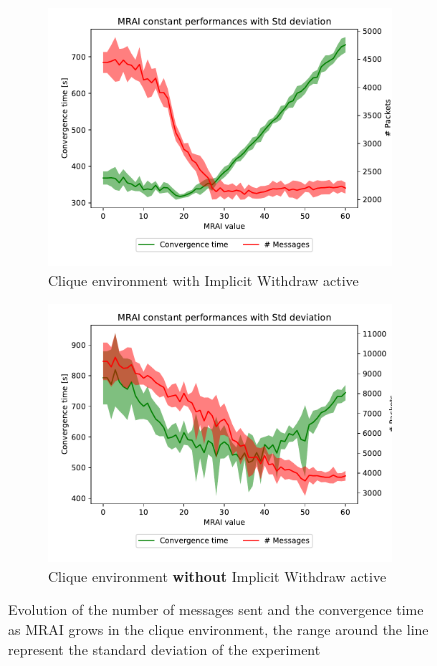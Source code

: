\documentclass[10pt,conference,letterpaper]{IEEEtran}
\newcommand{\figwidth}{0.78}
\newcommand{\figvspace}{-1.5em}
\begin{document}
\begin{figure}[tb]
	\centering

	\begin{subfigure}{\columnwidth}
		\centering
		\includegraphics[width=\figwidth\columnwidth]{images/clique/mrai_evolution_std_alpha}
		\caption{Clique environment with Implicit Withdraw active}
		\label{fig:clique_IW_mrai_evolution_std}
		\qquad
	\end{subfigure}

	\begin{subfigure}{\columnwidth}
		\centering
		\includegraphics[width=\figwidth\columnwidth]{images/clique-noImplicitWithdraw/mrai_evolution_std_alpha}
		\caption{Clique environment \textbf{without} Implicit Withdraw active}
		\label{fig:clique_noIW_mrai_evolution_std}
		\qquad
	\end{subfigure}

	\caption{Evolution of the number of messages sent and the convergence time as \ac{MRAI} grows
		in the clique environment, the range around the line represent the standard
		deviation of the experiment}
	\label{fig:clique_mrai_evolution_std}
	\vspace{\figvspace}
\end{figure}
\end{document}

